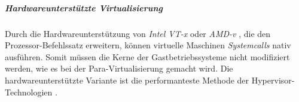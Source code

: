 \subparagraph{Hardwareunterstützte Virtualisierung}
Durch die Hardwareunterstützung von \emph{Intel VT-x} \cite{TechnologyIntel} oder \emph{AMD-v} \cite{AMDVirtualisierungstechnologie}, die den Prozessor-Befehlssatz erweitern, können virtuelle Maschinen \emph{Systemcalls} nativ ausführen. Somit müssen die Kerne der Gastbetriebssysteme nicht modifiziert werden, wie es bei der Para-Virtualisierung gemacht wird. Die hardwareunterstützte Variante ist die performanteste Methode der Hypervisor-Technologien \cite{Meinel2011VirtualisierungMarktubersicht}.




